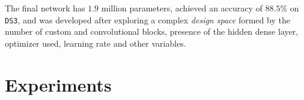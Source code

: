 \documentclass[11pt]{article}
\begin{document}
\begin{multicols}{2}
      The final network has $1.9$ million parameters, achieved an accuracy of $88.5\%$ on \texttt{DS3}, and was developed after exploring a complex \textit{design space} formed by the number of custom and convolutional blocks, presence of the hidden dense layer, optimizer used, learning rate and other variables.

      \label{sec:experiments}
      \section{Experiments}



\end{multicols}
\end{document}
